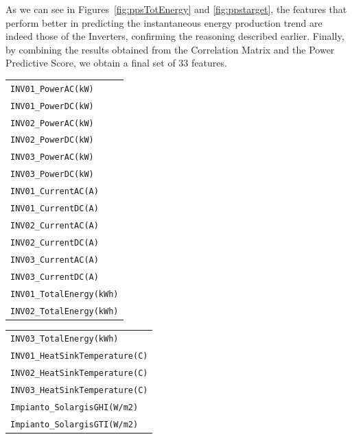 As we can see in Figures~\ref{fig:ppsTotEnergy} and \ref{fig:ppstarget}, the features
that perform better in predicting the instantaneous energy production trend are
indeed those of the Inverters, confirming the reasoning described earlier.
Finally, by combining the results obtained from the Correlation Matrix and the
Power Predictive Score, we obtain a final set of 33 features.

%
\begin{table}[H]
	\begin{center}
		\begin{tabular}[t]{l|}
			\verb|INV01_PowerAC(kW)|      \\
			\verb|INV01_PowerDC(kW)|      \\
			\verb|INV02_PowerAC(kW)|      \\
			\verb|INV02_PowerDC(kW)|      \\
			\verb|INV03_PowerAC(kW)|      \\
			\verb|INV03_PowerDC(kW)|      \\
			\verb|INV01_CurrentAC(A)|     \\
			\verb|INV01_CurrentDC(A)|     \\
			\verb|INV02_CurrentAC(A)|     \\
			\verb|INV02_CurrentDC(A)|     \\
			\verb|INV03_CurrentAC(A)|     \\
			\verb|INV03_CurrentDC(A)|     \\
			\verb|INV01_TotalEnergy(kWh)| \\
			\verb|INV02_TotalEnergy(kWh)|
		\end{tabular}
		\begin{tabular}[t]{l|}
			\verb|INV03_TotalEnergy(kWh)|       \\
			\verb|INV01_HeatSinkTemperature(C)| \\
			\verb|INV02_HeatSinkTemperature(C)| \\
			\verb|INV03_HeatSinkTemperature(C)| \\
			\verb|Impianto_SolargisGHI(W/m2)|   \\
			\verb|Impianto_SolargisGTI(W/m2)|   \\

\end{tabular}
\end{center}
\end{table}
